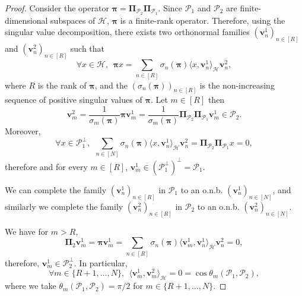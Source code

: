 \documentclass[twoside,11pt]{book}
\numberwithin{theorem}{chapter}
\numberwithin{definition}{chapter}
\numberwithin{proposition}{chapter}
\numberwithin{corollary}{chapter}
\numberwithin{example}{chapter}
\numberwithin{lemma}{chapter}
\numberwithin{assumption}{chapter}
\begin{document}
\begin{proof}
Consider the operator $\bm{\pi} = \bm{\Pi}_{\mathcal{P}_2} \bm{\Pi}_{\mathcal{P}_1}$. Since $\mathcal{P}_1$ and $\mathcal{P}_2$ are finite-dimensional subspaces of $\mathcal{H}$, $\bm{\pi}$ is a finite-rank operator. Therefore, using the singular value decomposition, there exists two orthonormal families $(\bm{v}^{1}_{n})_{n \in [R]}$ and $(\bm{v}^{2}_{n})_{n \in [R]}$ such that
\begin{equation}\label{eq:SVD_bmpi}
\forall x \in \mathcal{H}, \:\: \bm{\pi} x = \sum\limits_{n \in [R]} \sigma_{n}(\bm{\pi}) \langle x,\bm{v}^{1}_{n} \rangle_{\mathcal{H}} \bm{v}^{2}_{n},
\end{equation} 
where $R$ is the rank of $\bm{\pi}$, and the $(\sigma_n(\bm{\pi}))_{n \in [R]}$ is the non-increasing sequence of positive singular values of $\bm{\pi}$.
Let $m \in [R]$ then
\begin{equation}
 \bm{v}^{2}_{m} = \frac{1}{\sigma_{m}(\bm{\pi})} \bm{\pi} \bm{v}^{1}_{m} = \frac{1}{\sigma_{m}(\bm{\pi})} \bm{\Pi}_{\mathcal{P}_2} \bm{\Pi}_{\mathcal{P}_1} \bm{v}^{1}_{m} \in \mathcal{P}_2.
\end{equation}
Moreover, 
\begin{equation}
\forall x \in \mathcal{P}_1^{\perp}, \:\: \sum\limits_{n \in [N]} \sigma_{n}(\bm{\pi})\langle x,\bm{v}^{1}_{n} \rangle_{\mathcal{H}}\bm{v}^{2}_{n} = \bm{\Pi}_{\mathcal{P}_2} \bm{\Pi}_{\mathcal{P}_1} x =0,
\end{equation}
therefore
and for every $m \in [R]$, $\bm{v}_{m}^{1} \in (\mathcal{P}_1^{\perp})^{\perp} = \mathcal{P}_1$. 


We can complete the family $(\bm{v}^{1}_n)_{n \in [R]}$ in $\mathcal{P}_{1}$ to an o.n.b. $(\bm{v}_{n}^{1})_{n \in [N]}$, and similarly we complete the family $(\bm{v}^{2}_n)_{n \in [R]}$ in $\mathcal{P}_{2}$ to an o.n.b. $(\bm{v}_{n}^{2})_{n \in [N]}$. 

We have for $m >R$, 
\begin{equation}
\bm{\Pi}_{2} \bm{v}^{1}_{m} = \bm{\pi} \bm{v}^{1}_{m} = \sum\limits_{n \in [R]} \sigma_{n}(\bm{\pi}) \langle \bm{v}^{1}_{m}, \bm{v}^{1}_{n} \rangle_{\mathcal{H}} \bm{v}^{2}_{n} = 0,
\end{equation}
therefore, $\bm{v}^{1}_{m} \in \mathcal{P}_{2}^{\perp}$. In particular,
\begin{equation}
\forall m \in \{R+1, \dots, N \}, \:\: \langle \bm{v}^{1}_{m} ,\bm{v}^{2}_{m} \rangle_{\mathcal{H}} = 0 = \cos \theta_{m}(\mathcal{P}_{1}, \mathcal{P}_2),
\end{equation}
where we take $\theta_{m}(\mathcal{P}_{1}, \mathcal{P}_2) = \pi/2$ for $m \in \{R+1, \dots, N \}$.


\end{proof}
\end{document}
